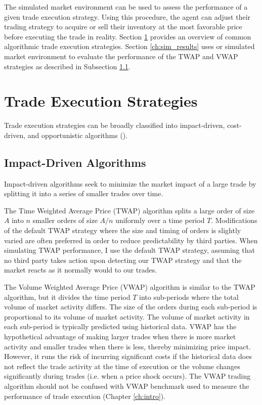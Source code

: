 The simulated market environment can be used to assess the performance of a given trade execution strategy. Using this procedure, the agent can adjust their trading strategy to acquire or sell their inventory at the most favorable price before executing the trade in reality. Section \ref{ch:strategies} provides an overview of common algorithmic trade execution strategies. Section \ref{ch:sim_results} uses or simulated market environment to evaluate the performance of the TWAP and VWAP strategies as described in Subsection \ref{ch:impact-driven}.

\section{Trade Execution Strategies} \label{ch:strategies}
Trade execution strategies can be broadly classified into impact-driven, cost-driven, and opportunistic algorithms (\cite{labadie:hal-00590283}).

\subsection{Impact-Driven Algorithms} \label{ch:impact-driven}
Impact-driven algorithms seek to minimize the market impact of a large trade by splitting it into a series of smaller trades over time. 

The Time Weighted Average Price (TWAP) algorithm splits a large order of size $A$ into $n$ smaller orders of size $A/n$ uniformly over a time period $T$. Modifications of the default TWAP strategy where the size and timing of orders is slightly varied are often preferred in order to reduce predictability by third parties. When simulating TWAP performance, I use the default TWAP strategy, assuming that no third party takes action upon detecting our TWAP strategy and that the market reacts as it normally would to our trades.

The Volume Weighted Average Price (VWAP) algorithm is similar to the TWAP algorithm, but it divides the time period $T$ into sub-periods where the total volume of market activity differs. The size of the orders during each sub-period is proportional to its volume of market activity. The volume of market activity in each sub-period is typically predicted using historical data. VWAP has the hypothetical advantage of making larger trades when there is more market activity and smaller trades when there is less, thereby minimizing price impact. However, it runs the risk of incurring significant costs if the historical data does not reflect the trade activity at the time of execution or the volume changes significantly during trades (i.e. when a price shock occurs). The VWAP trading algorithm should not be confused with VWAP benchmark used to measure the performance of trade execution (Chapter \ref{ch:intro}).

